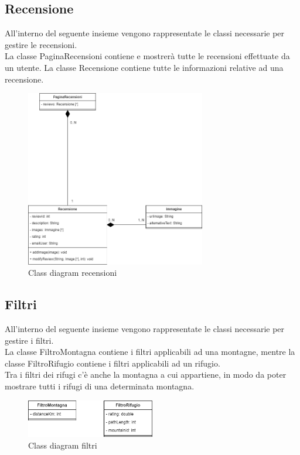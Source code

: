 \documentclass[a4paper,12pt]{article}
\begin{document}
\subsection{Recensione}
All'interno del seguente insieme vengono rappresentate le classi necessarie per gestire le recensioni.\\
La classe PaginaRecensioni contiene e mostrerà tutte le recensioni effettuate da un utente. La classe Recensione contiene tutte le informazioni relative ad una recensione.
\begin{figure}[H]
   \centering
   \includegraphics[width=0.70\textwidth] {D3/img/class_diagram_reviews.png}
    \caption{Class diagram recensioni}
\end{figure}

\subsection{Filtri}
All'interno del seguente insieme vengono rappresentate le classi necessarie per gestire i filtri.
\\ La classe FiltroMontagna contiene i filtri applicabili ad una montagne, mentre la classe FiltroRifugio contiene i filtri applicabili ad un rifugio.\\
Tra i filtri dei rifugi c'è anche la montagna a cui appartiene, in modo da poter mostrare tutti i rifugi di una determinata montagna.
\begin{figure}[H]
   \centering
   \includegraphics[width=0.5\textwidth] {D3/img/class_diagram_filters.png}
    \caption{Class diagram filtri}
\end{figure}
\newpage
\end{document}
